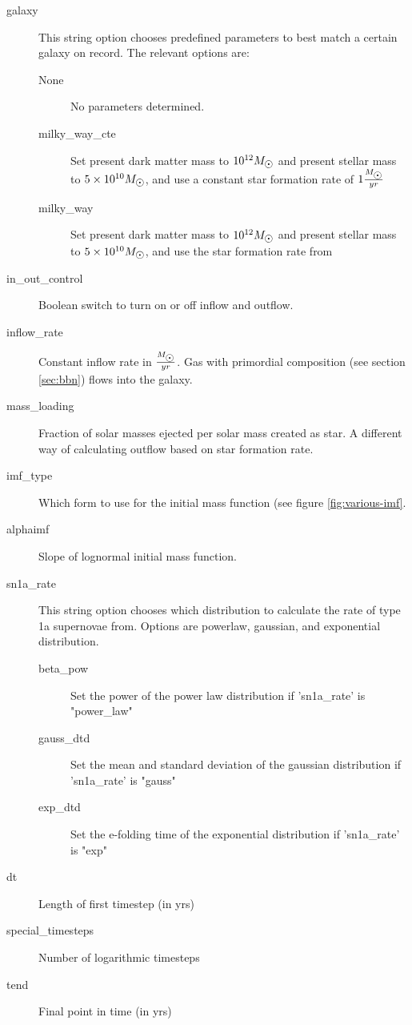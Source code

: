 \begin{description}
\item[galaxy]
  This string option chooses predefined parameters to best match a certain galaxy on record.
  The relevant options are:
  \begin{description}
  \item[None] No parameters determined.
  \item[milky\_way\_cte] Set present dark matter mass to $10^{12} \msol$ and present stellar mass to $5\times10^{10} \msol$, and use a constant star formation rate of $1 \frac{\msol}{yr}$
  \item[milky\_way] Set present dark matter mass to $10^{12} \msol$ and present stellar mass to $5\times10^{10} \msol$, and use the star formation rate from 
  \end{description}
\item[in\_out\_control] Boolean switch to turn on or off inflow and outflow.
\item[inflow\_rate] Constant inflow rate in $\frac{\msol}{yr}$. Gas with primordial composition (see section \ref{sec:bbn}) flows into the galaxy.
\item[mass\_loading] Fraction of solar masses ejected per solar mass created as star. A different way of calculating outflow based on star formation rate.
\item[imf\_type] Which form to use for the initial mass function (see figure \ref{fig:various-imf}. 
\item[alphaimf] Slope of lognormal initial mass function. 
\item[sn1a\_rate] This string option chooses which distribution to calculate the rate of type 1a supernovae from.
  Options are powerlaw, gaussian, and exponential distribution.
  \begin{description}
  \item[beta\_pow] Set the power of the power law distribution if 'sn1a\_rate' is "power\_law" 
  \item[gauss\_dtd] Set the mean and standard deviation of the gaussian distribution if 'sn1a\_rate' is "gauss" 
  \item[exp\_dtd] Set the e-folding time of the exponential distribution if 'sn1a\_rate' is "exp"
  \end{description}
\item[dt] Length of first timestep (in yrs)
\item[special\_timesteps] Number of logarithmic timesteps
\item[tend] Final point in time (in yrs)

\end{description}
